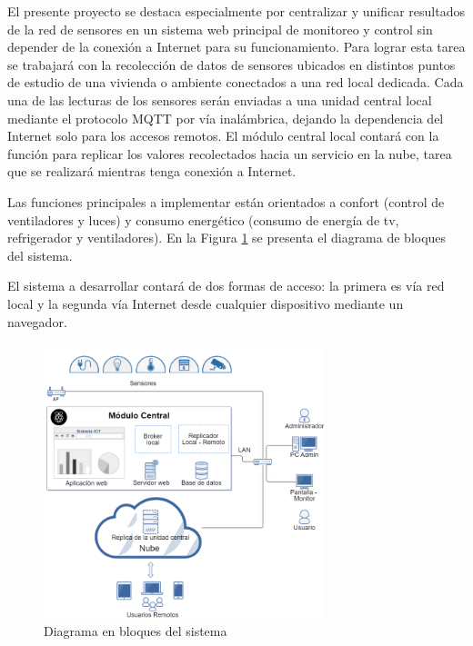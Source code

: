 \documentclass[11pt]{charter}
\begin{document}
El presente proyecto se destaca especialmente por centralizar y unificar resultados de la red de sensores en un sistema web principal de monitoreo y control sin depender de la conexión a Internet para su funcionamiento. Para lograr esta tarea se trabajará con la recolección de datos de sensores ubicados en distintos puntos de estudio de una vivienda o ambiente conectados a una red local dedicada. Cada una de las lecturas de los sensores serán enviadas a una unidad central local mediante el protocolo MQTT por vía inalámbrica, dejando la dependencia del Internet solo para los accesos remotos. El módulo central local contará con la función para replicar los valores recolectados hacia un servicio en la nube, tarea que se realizará mientras tenga conexión a Internet.

Las funciones principales a implementar están orientados a confort (control de ventiladores y luces) y consumo energético (consumo de energía de tv, refrigerador y ventiladores). En la Figura \ref{fig:diagBloques} se presenta el diagrama de bloques del sistema. 

El sistema a desarrollar contará de dos formas de acceso: la primera es vía red local y la segunda vía Internet desde cualquier dispositivo mediante un navegador.


\begin{figure}[htpb]
\centering 
\includegraphics[width=0.73\textwidth]{./Figuras/diagBloques.png}
\caption{Diagrama en bloques del sistema}
\label{fig:diagBloques}
\end{figure}
\end{document}
